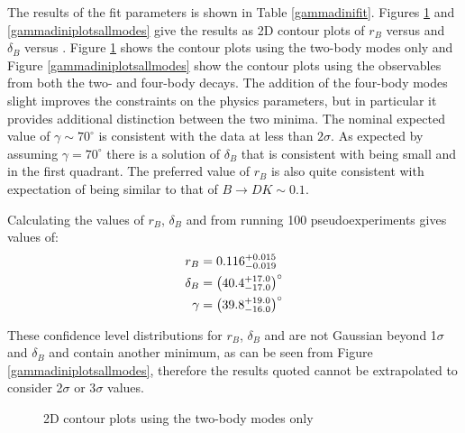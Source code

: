 The results of the fit parameters is shown in Table \ref{gammadinifit}. Figures \ref{gammadiniplots2body} and \ref{gammadiniplotsallmodes} give the results as 2D contour plots of $r_B$ versus \Pgamma and $\delta_B$ versus \Pgamma. Figure \ref{gammadiniplots2body} shows the contour plots using the two-body modes only and Figure \ref{gammadiniplotsallmodes} show the contour plots using the observables from both the two- and four-body decays. The addition of the four-body modes slight improves the constraints on the physics parameters, but in particular it provides additional distinction between the two minima. The nominal expected value of $\gamma \sim 70^\circ$ is consistent with the data at less than $2\sigma$. As expected by assuming $\gamma=70^\circ$ there is a solution of $\delta_B$ that is consistent with being small and in the first quadrant. The preferred value of $r_B$ is also quite consistent with expectation of being similar to that of $B \to DK \sim 0.1$.

Calculating the values of $r_B$, $\delta_B$ and \Pgamma from running 100 pseudoexperiments gives values of:
\begin{align*}
r_B &= 0.116^{+0.015}_{-0.019} \\
\delta_B &= \left(40.4^{+17.0}_{-17.0}\right)^{\circ} \\
\gamma &= \left(39.8^{+19.0}_{-16.0}\right)^{\circ} 
\end{align*}

These confidence level distributions for $r_B$, $\delta_B$ and \Pgamma are not Gaussian beyond 1$\sigma$ and $\delta_B$ and \Pgamma contain another minimum, as can be seen from Figure \ref{gammadiniplotsallmodes}, therefore the results quoted cannot be extrapolated to consider 2$\sigma$ or 3$\sigma$ values. 

\begin{figure}
\centering
{}
\caption{2D contour plots using the two-body modes only}
\label{gammadiniplots2body}
\end{figure}

